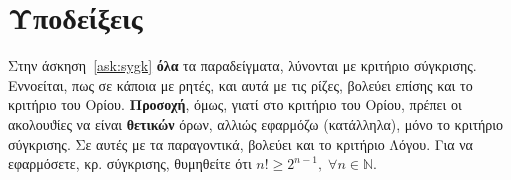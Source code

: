 \begin{enumerate}
  \end{enumerate}

  \section*{Υποδείξεις}

  \begin{myitemize}
    \item Στην άσκηση~\ref{ask:sygk} \textbf{όλα} τα παραδείγματα, λύνονται με 
      κριτήριο σύγκρισης. Εννοείται, πως σε κάποια με ρητές, και αυτά με τις ρίζες, 
      βολεύει επίσης και το κριτήριο του Ορίου.
      \textbf{Προσοχή}, όμως, γιατί στο κριτήριο του Ορίου, πρέπει οι ακολουϑίες να είναι
      \textbf{θετικών} όρων, αλλιώς εφαρμόζω (κατάλληλα), μόνο το κριτήριο σύγκρισης.
      Σε αυτές με τα παραγοντικά, βολεύει και το κριτήριο Λόγου. 
      Για να εφαρμόσετε, κρ. σύγκρισης, θυμηθείτε ότι
      $ n! \geq 2^{n-1}, \; \forall n \in \mathbb{N} $.
  \end{myitemize}

  

